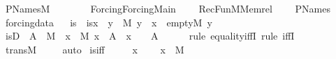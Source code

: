 %
\begin{isabellebody}%
%
%
\isadelimtheory
%
\endisadelimtheory
%
\isatagtheory
{}\isamarkupfalse%
\ P{\isacharunderscore}{\kern0pt}Names{\isacharunderscore}{\kern0pt}M\isanewline
\ \ \ \isanewline
\ \ \ \ {\isachardoublequoteopen}Forcing{\isacharslash}{\kern0pt}Forcing{\isacharunderscore}{\kern0pt}Main{\isachardoublequoteclose}\isanewline
\ \ \ \ RecFun{\isacharunderscore}{\kern0pt}M{\isacharunderscore}{\kern0pt}Memrel\isanewline
\ \ \ \ P{\isacharunderscore}{\kern0pt}Names\isanewline
{}%
\endisatagtheory
{\isafoldtheory}%
%
\isadelimtheory
\ \isanewline
%
\endisadelimtheory
\isanewline
{}\isamarkupfalse%
\ forcing{\isacharunderscore}{\kern0pt}data\isanewline
{}\ \isanewline
\isanewline
{}\isamarkupfalse%
\ is{\isacharunderscore}{\kern0pt}{}\ \ {\isachardoublequoteopen}is{\isacharunderscore}{\kern0pt}{}{\isacharparenleft}{\kern0pt}x{\isacharparenright}{\kern0pt}\ {\isasymequiv}\ {\isasymforall}y\ {\isasymin}\ M{\isachardot}{\kern0pt}\ y\ {\isasymin}\ x\ {\isasymlongleftrightarrow}\ empty{\isacharparenleft}{\kern0pt}{\isacharhash}{\kern0pt}{\isacharhash}{\kern0pt}M{\isacharcomma}{\kern0pt}\ y{\isacharparenright}{\kern0pt}{\isachardoublequoteclose}\ \isanewline
\isanewline
{}\isamarkupfalse%
\ is{\isacharunderscore}{\kern0pt}{}D\ {\isacharcolon}{\kern0pt}\ {\isachardoublequoteopen}A\ {\isasymin}\ M\ {\isasymLongrightarrow}\ {\isasymforall}x\ {\isasymin}\ M{\isachardot}{\kern0pt}\ x\ {\isasymin}\ A\ {\isasymlongleftrightarrow}\ x\ {\isacharequal}{\kern0pt}\ {}\ {\isasymLongrightarrow}\ A\ {\isacharequal}{\kern0pt}\ {}{\isachardoublequoteclose}\ \isanewline
%
\isadelimproof
\ \ %
\endisadelimproof
%
\isatagproof
{}\isamarkupfalse%
{\isacharparenleft}{\kern0pt}rule\ equality{\isacharunderscore}{\kern0pt}iffI{\isacharsemicolon}{\kern0pt}\ rule\ iffI{\isacharparenright}{\kern0pt}\ \isanewline
\ \ \isamarkupfalse%
\ transM\ \isanewline
\ \ \isamarkupfalse%
\ auto%
\endisatagproof
{\isafoldproof}%
%
\isadelimproof
\isanewline
%
\endisadelimproof
\isanewline
{}\isamarkupfalse%
\ is{\isacharunderscore}{\kern0pt}{}{\isacharunderscore}{\kern0pt}iff\ {\isacharcolon}{\kern0pt}\ \isanewline
\ \ \ x\ \isanewline
\ \ \ {\isachardoublequoteopen}x\ {\isasymin}\ M{\isachardoublequoteclose}\ \isanewline

\end{isabellebody}
